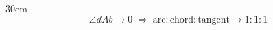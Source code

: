 \documentclass[border=4pt]{standalone}
\begin{document}
\begin{varwidth}{30em}
\large
\[ \angle dAb \to 0 \;\Rightarrow\; \text{arc}:\text{chord}:\text{tangent}\to 1:1:1 \]

\end{varwidth}
\end{document}

